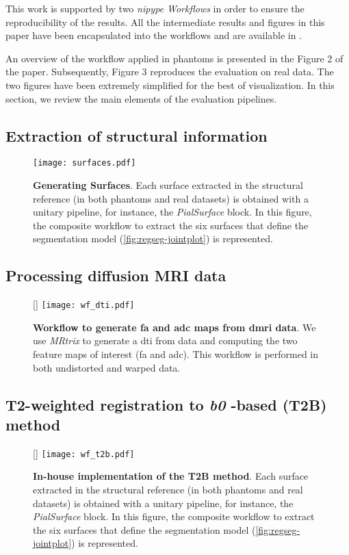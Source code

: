 \documentclass[a4paper]{report}
\begin{document}
This work is supported by two \emph{nipype Workflows} in order to ensure the reproducibility
  of the results.
All the intermediate results and figures in this paper have been encapsulated into
  the workflows and are available in \citep{esteban_regseg_2015}.

An overview of the workflow applied in phantoms is presented in the Figure 2 of the paper.
Subsequently, Figure 3 reproduces the evaluation on real data.
The two figures have been extremely simplified for the best of visualization.
In this section, we review the main elements of the evaluation pipelines.

\subsection{Extraction of structural information}
\begin{figure}[!ht]
  \texttt{[image: surfaces.pdf]}
  \caption{\textbf{Generating Surfaces}.
  Each surface extracted in the structural reference
    (in both phantoms and real datasets) is obtained with a unitary pipeline,
    for instance, the \emph{PialSurface} block.
  In this figure, the composite workflow to extract the six surfaces that define the
    segmentation model (\autoref{fig:regseg-jointplot}) is represented.
  }\label{fig:regseg-wf_surfaces}
\end{figure}

\subsection{Processing diffusion MRI data}
\begin{figure}[!ht]
  [\FBwidth]
  {\texttt{[image: wf\_dti.pdf]}}
  {\caption{\textbf{Workflow to generate \gls*{fa} and \gls*{adc} maps from \gls*{dmri} data}.
    We use \emph{MRtrix} \citep{tournier_mrtrix_2012} to generate a \gls*{dti} from data and
      computing the two feature maps of interest (\gls*{fa} and \gls*{adc}).
    This workflow is performed in both undistorted and warped data.}\label{fig:regseg-wf_dti}}
\end{figure}

\subsection{T2-weighted registration to \emph{b0} -based (T2B) method}
\begin{figure}[!ht]
  [\FBwidth]
  {\texttt{[image: wf\_t2b.pdf]}}
  {\caption{\textbf{In-house implementation of the T2B method}.
    Each surface extracted in the structural reference
      (in both phantoms and real datasets) is obtained with a unitary pipeline,
      for instance, the \emph{PialSurface} block.
    In this figure, the composite workflow to extract the six surfaces that define the
      segmentation model (\autoref{fig:regseg-jointplot}) is represented.}\label{fig:regseg-wf_t2b}}
\end{figure}
\end{document}
